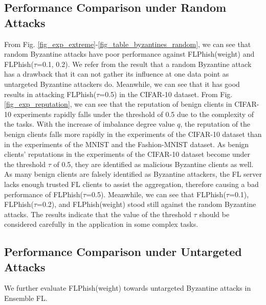 \documentclass[journal]{IEEEtran}
\begin{document}
  \subsection{Performance Comparison under Random Attacks}
  From Fig. \ref{fig_exp_extreme}-\ref{fig_table_byzantines_random}, we can see that random Byzantine attacks have poor performance against FLPhish(weight) and FLPhish($\tau$=0.1, 0.2). We refer from the result that a random Byzantine attack has a drawback that it can not gather its influence at one data point as untargeted Byzantine attackers do. Meanwhile, we can see that it has good results in attacking FLPhish($\tau$=0.5) in the CIFAR-10 dataset. From Fig. \ref{fig_exp_reputation}, we can see that the reputation of benign clients in CIFAR-10 experiments rapidly falls under the threshold of 0.5 due to the complexity of the tasks. With the increase of imbalance degree value $q$, the reputation of the benign clients falls more rapidly in the experiments of the CIFAR-10 dataset than in the experiments of the MNIST and the Fashion-MNIST dataset. As benign clients' reputations in the experiments of the CIFAR-10 dataset become under the threshold $\tau$ of 0.5, they are identified as malicious Byzantine clients as well. As many benign clients are falsely identified as Byzantine attackers, the FL server lacks enough trusted FL clients to assist the aggregation, therefore causing a bad performance of FLPhish($\tau$=0.5). Meanwhile, we can see that FLPhish($\tau$=0.1), FLPhish($\tau$=0.2), and FLPhish(weight) stood still against the random Byzantine attacks. The results indicate that the value of the threshold $\tau$ should be considered carefully in the application in some complex tasks.








  \subsection{{Performance Comparison under Untargeted Attacks}} We further evaluate FLPhish(weight) towards untargeted Byzantine attacks in Ensemble FL.
  

  
\end{document}
